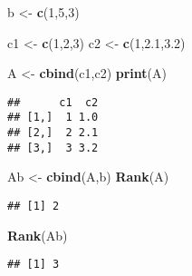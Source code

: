 \documentclass[
]{article}
\newenvironment{Shaded}{\begin{snugshade}}{\end{snugshade}}
\newcommand{\DecValTok}[1]{\textcolor[rgb]{0.00,0.00,0.81}{#1}}
\newcommand{\FloatTok}[1]{\textcolor[rgb]{0.00,0.00,0.81}{#1}}
\newcommand{\FunctionTok}[1]{\textcolor[rgb]{0.13,0.29,0.53}{\textbf{#1}}}
\newcommand{\NormalTok}[1]{#1}
\newcommand{\OtherTok}[1]{\textcolor[rgb]{0.56,0.35,0.01}{#1}}
\begin{document}
\begin{Shaded}
\begin{Highlighting}[]
\NormalTok{b }\OtherTok{\textless{}{-}} \FunctionTok{c}\NormalTok{(}\DecValTok{1}\NormalTok{,}\DecValTok{5}\NormalTok{,}\DecValTok{3}\NormalTok{)}

\NormalTok{c1 }\OtherTok{\textless{}{-}} \FunctionTok{c}\NormalTok{(}\DecValTok{1}\NormalTok{,}\DecValTok{2}\NormalTok{,}\DecValTok{3}\NormalTok{)}
\NormalTok{c2 }\OtherTok{\textless{}{-}} \FunctionTok{c}\NormalTok{(}\DecValTok{1}\NormalTok{,}\FloatTok{2.1}\NormalTok{,}\FloatTok{3.2}\NormalTok{)}

\NormalTok{A }\OtherTok{\textless{}{-}} \FunctionTok{cbind}\NormalTok{(c1,c2)}
\FunctionTok{print}\NormalTok{(A)}
\end{Highlighting}
\end{Shaded}

\begin{verbatim}
##      c1  c2
## [1,]  1 1.0
## [2,]  2 2.1
## [3,]  3 3.2
\end{verbatim}

\begin{Shaded}
\begin{Highlighting}[]
\NormalTok{Ab }\OtherTok{\textless{}{-}} \FunctionTok{cbind}\NormalTok{(A,b)}
\FunctionTok{Rank}\NormalTok{(A)}
\end{Highlighting}
\end{Shaded}

\begin{verbatim}
## [1] 2
\end{verbatim}

\begin{Shaded}
\begin{Highlighting}[]
\FunctionTok{Rank}\NormalTok{(Ab)}
\end{Highlighting}
\end{Shaded}

\begin{verbatim}
## [1] 3
\end{verbatim}
\end{document}
